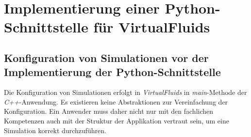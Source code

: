 \chapter{Implementierung einer Python-\\Schnittstelle für VirtualFluids}

\section{Konfiguration von Simulationen vor der Implementierung der Python-Schnittstelle}

Die Konfiguration von Simulationen erfolgt in \textit{VirtualFluids} in \textit{main}-Methode der \textit{C++}-Anwendung. 
Es existieren keine Abstraktionen zur Vereinfachung der Konfiguration. Ein Anwender muss daher nicht nur mit den fachlichen Kompetenzen auch mit der Struktur der Applikation vertraut sein, um eine Simulation korrekt durchzuführen.